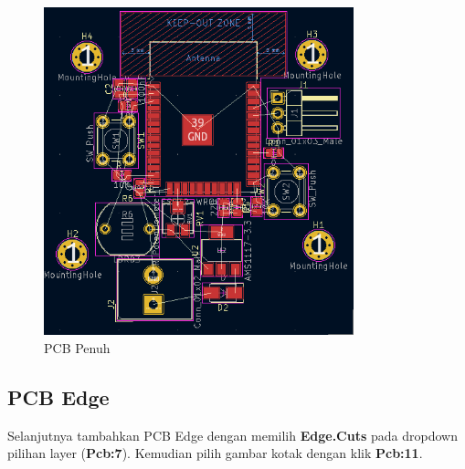 \documentclass[12pt]{book}
\begin{document}
	\begin{figure}[!ht]
		\centering
		\includegraphics[width=0.8\textwidth]{images/pcb/pcb_7}
		\caption{PCB Penuh}
	\end{figure}

	\subsection{PCB Edge}

	Selanjutnya tambahkan PCB Edge dengan memilih \textbf{Edge.Cuts} pada dropdown pilihan layer (\textbf{Pcb:7}).
	Kemudian pilih gambar kotak dengan klik \textbf{Pcb:11}.
\end{document}
